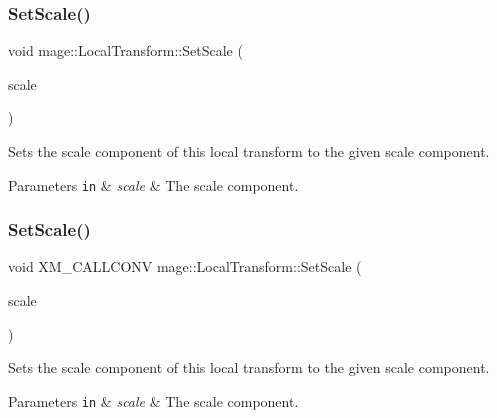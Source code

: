 \subsubsection{\texorpdfstring{Set\+Scale()}{SetScale()}\hspace{0.1cm}{\footnotesize\ttfamily [3/4]}}
{\footnotesize\ttfamily void mage\+::\+Local\+Transform\+::\+Set\+Scale (\begin{DoxyParamCaption}\item[{\mbox{\hyperlink{namespacemage_a0fef5ab4e073c2d9ea876fefa3da4233}{F32x3}}}]{scale }\end{DoxyParamCaption})\hspace{0.3cm}{\ttfamily [noexcept]}}

Sets the scale component of this local transform to the given scale component.


\begin{DoxyParams}[1]{Parameters}
\mbox{\tt in}  & {\em scale} & The scale component. \\
\hline
\end{DoxyParams}
\mbox{\label{classmage_1_1_local_transform_a2f8086f72f3c72a641db1b59e8b3e9c0}} 
\subsubsection{\texorpdfstring{Set\+Scale()}{SetScale()}\hspace{0.1cm}{\footnotesize\ttfamily [4/4]}}
{\footnotesize\ttfamily void X\+M\+\_\+\+C\+A\+L\+L\+C\+O\+NV mage\+::\+Local\+Transform\+::\+Set\+Scale (\begin{DoxyParamCaption}\item[{F\+X\+M\+V\+E\+C\+T\+OR}]{scale }\end{DoxyParamCaption})\hspace{0.3cm}{\ttfamily [noexcept]}}

Sets the scale component of this local transform to the given scale component.


\begin{DoxyParams}[1]{Parameters}
\mbox{\tt in}  & {\em scale} & The scale component. \\
\hline
\end{DoxyParams}
\mbox{\label{classmage_1_1_local_transform_afaab2f329bb986de112e76ba8407b84e}} 
